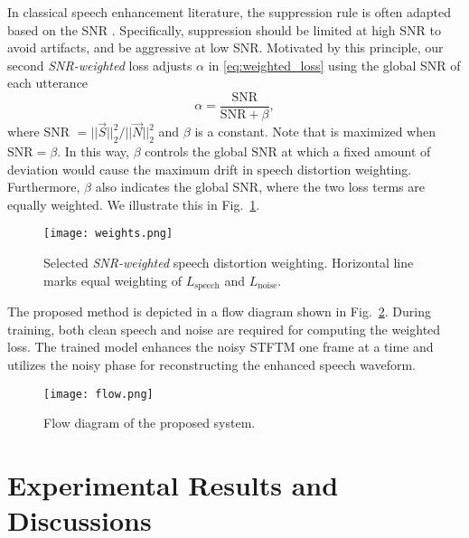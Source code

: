 \documentclass{article}
\begin{document}
In classical speech enhancement literature, the suppression rule is often adapted based on the \ac{SNR} \cite{esch2009,braun2015}. Specifically, suppression should be limited at high \ac{SNR} to avoid artifacts, and be aggressive at low \ac{SNR}. Motivated by this principle, our second \textit{SNR-weighted} loss adjusts $\alpha$ in \eqref{eq:weighted_loss} using the global \ac{SNR} of each utterance 
\begin{equation}
\alpha =  \frac{\text{SNR}}{\text{SNR} + \beta},
\end{equation}
where SNR $=||\vec{S}||^2_2/||\vec{N}||^2_2$ and $\beta$ is a constant. Note that  is maximized when $\text{SNR} = \beta$. In this way, $\beta$ controls the global \ac{SNR} at which a fixed amount of deviation would cause the maximum drift in speech distortion weighting. Furthermore, $\beta$ also indicates the global \ac{SNR}, where the two loss terms are equally weighted. We illustrate this in Fig.~\ref{fig:weight}.

\begin{figure}[tb]
  \texttt{[image: weights.png]}
  \caption{Selected \textit{SNR-weighted} speech distortion weighting. Horizontal line marks equal weighting of $L_{\text{speech}}$ and $L_{\text{noise}}$.}
  \label{fig:weight}
\end{figure}

The proposed method is depicted in a flow diagram shown in Fig.~\ref{fig:flow}. During training, both clean speech and noise are required for computing the weighted loss. The trained model enhances the noisy \ac{STFTM} one frame at a time and utilizes the noisy phase for reconstructing the enhanced speech waveform.
\begin{figure}[tb]
 \texttt{[image: flow.png]}
 \setlength{\abovecaptionskip}{-5pt}
 \setlength{\belowcaptionskip}{-5pt}
 \caption{Flow diagram of the proposed system.}
 \label{fig:flow}
\end{figure}
\section{Experimental Results and Discussions}
\label{sec:exp}
\end{document}
